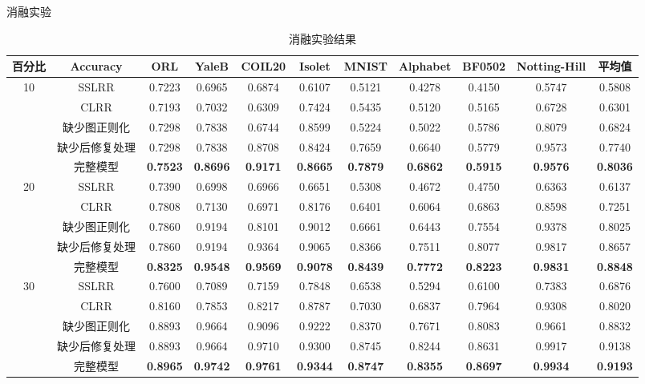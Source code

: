 \documentclass{beamer}
\begin{document}
\begin{frame}{消融实验}
\vspace{-0.25cm}
\begin{table}[H]
    \tiny
		\renewcommand{\arraystretch}{1.4}
		\setlength\tabcolsep{2pt}
		\caption{消融实验结果}
		\label{table_2}
		\centering
		\begin{tabular}{ccccccccccc}
			\hline
			百分比 & \textbf{Accuracy} & ORL & YaleB & COIL20 & Isolet & MNIST & Alphabet & BF0502 & Notting-Hill & \textbf{平均值}\\ 
			\hline
			\multirow{5}{*}{10} 
			& SSLRR & 0.7223 & 0.6965 & 0.6874 & 0.6107 & 0.5121 & 0.4278 & 0.4150 & 0.5747 & 0.5808 \\
			& CLRR & 0.7193 & 0.7032 & 0.6309 & 0.7424 & 0.5435 & 0.5120 & 0.5165 & 0.6728 & 0.6301 \\
			& 缺少图正则化 & 0.7298 & 0.7838 & 0.6744 & 0.8599 & 0.5224 & 0.5022 & 0.5786 & 0.8079 & 0.6824 \\
			& 缺少后修复处理 & 0.7298 & 0.7838 & 0.8708 & 0.8424 & 0.7659 & 0.6640 & 0.5779 & 0.9573 & 0.7740 \\
			& 完整模型 & \textbf{0.7523} & \textbf{0.8696} & \textbf{0.9171} & \textbf{0.8665} & \textbf{0.7879} & \textbf{0.6862} & \textbf{0.5915} & \textbf{0.9576} & \textbf{0.8036}\\
			
			\hline
			\multirow{5}{*}{20}
			& SSLRR & 0.7390 & 0.6998 & 0.6966 & 0.6651 & 0.5308 & 0.4672 & 0.4750 & 0.6363 & 0.6137 \\
			& CLRR & 0.7808 & 0.7130 & 0.6971 & 0.8176 & 0.6401 & 0.6064 & 0.6863 & 0.8598 & 0.7251 \\
			& 缺少图正则化 & 0.7860 & 0.9194 & 0.8101 & 0.9012 & 0.6661 & 0.6443 & 0.7554 & 0.9378 & 0.8025 \\
			& 缺少后修复处理 & 0.7860 & 0.9194 & 0.9364 & 0.9065 & 0.8366 & 0.7511 & 0.8077 & 0.9817 & 0.8657 \\
			& 完整模型 & \textbf{0.8325} & \textbf{0.9548} & \textbf{0.9569} & \textbf{0.9078} & \textbf{0.8439} & \textbf{0.7772} & \textbf{0.8223} & \textbf{0.9831} & \textbf{0.8848}
			\\
			
			\hline
			\multirow{5}{*}{30} 
			& SSLRR & 0.7600 & 0.7089 & 0.7159 & 0.7848 & 0.6538 & 0.5294 & 0.6100 & 0.7383 & 0.6876 \\
			& CLRR & 0.8160 & 0.7853 & 0.8217 & 0.8787 & 0.7030 & 0.6837 & 0.7964 & 0.9308 & 0.8020 \\
			& 缺少图正则化 & 0.8893 & 0.9664 & 0.9096 & 0.9222 & 0.8370 & 0.7671 & 0.8083 & 0.9661 & 0.8832 \\
			& 缺少后修复处理 & 0.8893 & 0.9664 & 0.9710 & 0.9300 & 0.8745 & 0.8244 & 0.8631 & 0.9917 & 0.9138 \\
			& 完整模型 & \textbf{0.8965} & \textbf{0.9742} & \textbf{0.9761} & \textbf{0.9344} & \textbf{0.8747} & \textbf{0.8355} & \textbf{0.8697} & \textbf{0.9934} & \textbf{0.9193} \\ 
			\hline
		\end{tabular}
	\end{table}

\end{frame}
\end{document}

